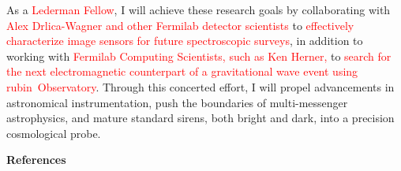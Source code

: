 \documentclass[11pt]{article}
\newcommand{\tcolor}{red}
\newcommand{\TODO}[1]{%
  \marginnote{\color{red}\textbf{TODO}}%
  {\color{red}#1}%
}
\newcommand{\hindex}{8}
\newcommand{\hindexDate}{August 2026}
\newcommand{\Rubin}{\ac{rubin}}
\newcommand{\Institute}{\textcolor{\tcolor}{Fermilab National Accelerator Laboratory}}
\newcommand{\Position}{\textcolor{\tcolor}{Lederman Fellow}}
\begin{document}
As a \Position, I will achieve these research goals by collaborating with \textcolor{\tcolor}{Alex Drlica-Wagner and other Fermilab detector scientists} to \textcolor{\tcolor}{effectively characterize image sensors for future spectroscopic surveys}, in addition to working with \textcolor{\tcolor}{Fermilab Computing Scientists, such as Ken Herner,} to \textcolor{\tcolor}{search for the next electromagnetic counterpart of a gravitational wave event using \Rubin\ Observatory}.
Through this concerted effort, I will propel advancements in astronomical instrumentation, push the boundaries of multi-messenger astrophysics, and mature standard sirens, both bright and dark, into a precision cosmological probe.

\newpage

\textbf{References}
\renewcommand{\refname}{}
\vspace{-3\baselineskip}
{\small}
\end{document}
